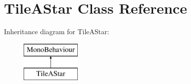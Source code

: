 \hypertarget{class_tile_a_star}{}\section{Tile\+A\+Star Class Reference}
\label{class_tile_a_star}
Inheritance diagram for Tile\+A\+Star\+:\begin{figure}[H]
\begin{center}
\leavevmode
\includegraphics[height=2.000000cm]{class_tile_a_star}
\end{center}
\end{figure}
